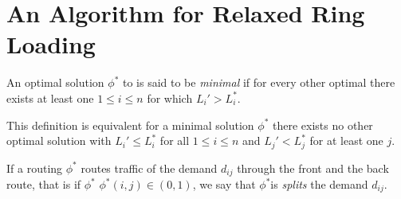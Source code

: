 \section{An Algorithm for Relaxed Ring Loading}

\begin{definition}
	An optimal solution $\phi^\ast$ to \RRL is said to be \emph{minimal} if for every other optimal there exists at least one $1 \leq i \leq n$ for which $L_i' > L_i^\ast$.
\end{definition}
This definition is equivalent for a minimal solution $\phi^\ast$ there exists no other optimal solution with $L_i' \leq L_i^\ast$ for all $1 \leq i \leq n$ and $L_j' < L_j^\ast$ for at least one $j$.

If a routing $\phi^\ast$ routes traffic of the demand $d_{ij}$ through the front and the back route, that is if $\phi^\ast$ $\phi^\ast(i, j) \in (0, 1)$, we say that $\phi^\ast$is \emph{splits} the demand $d_{ij}$.

